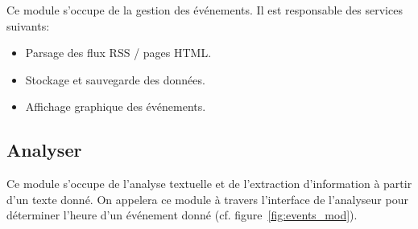 Ce module s'occupe de la gestion des événements. Il est responsable des services suivants:
\begin{itemize}
\renewcommand{\labelitemi}{$\bullet$}
\item Parsage des flux RSS / pages HTML.
\item Stockage et sauvegarde des données.
\item Affichage graphique des événements.
\end{itemize}


\subsection{Analyser}
Ce module s'occupe de l'analyse textuelle et de l'extraction d'information à partir d'un texte donné. On appelera ce module à travers l'interface de l'analyseur pour déterminer l'heure d'un événement donné (cf. figure~\ref{fig:events_mod}).